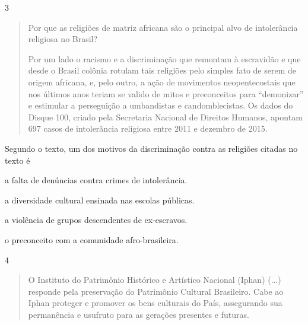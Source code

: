 \num{3}

\begin{quote}
Por que as religiões de matriz africana são o principal alvo de
intolerância religiosa no Brasil?

Por um lado o racismo e a discriminação que remontam à escravidão e que
desde o Brasil colônia rotulam tais religiões pelo simples fato de serem
de origem africana, e, pelo outro, a ação de movimentos neopentecostais
que nos últimos anos teriam se valido de mitos e preconceitos para
``demonizar'' e estimular a perseguição a umbandistas e candomblecistas.
Os dados do Disque 100, criado pela Secretaria Nacional de Direitos
Humanos, apontam 697 casos de intolerância religiosa entre 2011 e
dezembro de 2015.
\end{quote}

Segundo o texto, um dos motivos da discriminação contra as religiões
citadas no texto é

\begin{escolha}
\item a falta de denúncias contra crimes de intolerância.

\item a diversidade cultural ensinada nas escolas públicas.

\item a violência de grupos descendentes de ex-escravos.

\item o preconceito com a comunidade afro-brasileira.
\end{escolha}


\num{4}

\begin{quote}
O Instituto do Patrimônio Histórico e Artístico Nacional (Iphan)
(...) responde pela preservação do Patrimônio Cultural Brasileiro. Cabe
ao Iphan proteger e promover os bens culturais do País, assegurando sua
permanência e usufruto para as gerações presentes e futuras.
\end{quote}

